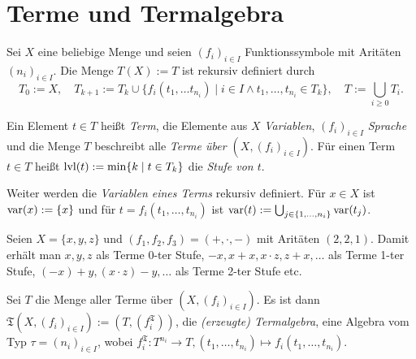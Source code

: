 \section{Terme und Termalgebra}

\begin{definition}
    Sei $X$ eine beliebige Menge und seien $(f_i)_{i \in I}$ Funktionssymbole mit Aritäten $(n_i)_{i \in I}$. Die Menge $T(X) := T$ ist rekursiv definiert durch $$T_0 := X ,\quad T_{k+1} := T_k \cup \{f_i(t_1, \ldots t_{n_i}) \mid i \in I \land t_1, \ldots, t_{n_i} \in T_k\},\quad T := \bigcup_{i \ge 0} T_i.$$ 
    
    Ein Element $t \in T$ heißt \emph{Term}, die Elemente aus $X$ \emph{Variablen}, $(f_i)_{i \in I}$ \emph{Sprache} und die Menge $T$ beschreibt alle \emph{Terme über $(X, (f_i)_{i \in I})$}.
    Für einen Term $t \in T$ heißt $\operatorname{lvl}(t) := \min\{k \mid t \in T_k\}$ die \emph{Stufe von $t$}. 
    
    Weiter werden die \emph{Variablen eines Terms} rekursiv definiert. Für $x \in X$ ist $\operatorname{var}(x) := \{x\}$ und für $t = f_i(t_1, \ldots, t_{n_i})$ ist $\operatorname{var}(t) := \bigcup_{j \in \{1, \ldots, n_i\}} \operatorname{var}(t_j)$.
\end{definition}

\begin{example}
    Seien $X = \{x,y,z\}$ und $(f_1, f_2, f_3) = (+, \cdot, -)$ mit Aritäten $(2,2,1)$. Damit erhält man $x,y,z$ als Terme 0-ter Stufe, $-x, x+x, x\cdot z, z + x, \ldots$ als Terme 1-ter Stufe, $(-x) + y, (x \cdot z) - y, \ldots$ als Terme 2-ter Stufe etc.
\end{example}

\begin{definition}
    Sei $T$ die Menge aller Terme über $(X, (f_i)_{i \in I})$. Es ist dann $\mathfrak{T}(X, (f_i)_{i \in I}) := (T, (f_i^\mathfrak{T}))$, die \emph{(erzeugte) Termalgebra}, eine Algebra vom Typ $\tau = (n_i)_{i \in I}$, wobei $f_i^\mathfrak{T}: T^{n_i} \to T, (t_1, \ldots, t_{n_i}) \mapsto f_i(t_1, \ldots, t_{n_i})$.
\end{definition}


